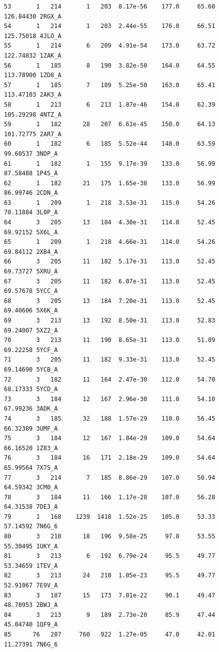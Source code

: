 \documentclass[
  letterpaper,
  DIV=11,
  numbers=noendperiod]{scrartcl}
\begin{document}
\begin{verbatim}
53       1   214       1   203  8.17e-56    177.0     65.60   126.84430 2RGX_A
54       1   214       1   203  2.44e-55    176.0     66.51   125.75018 4JLO_A
55       1   214       6   209  4.91e-54    173.0     63.72   122.74832 1ZAK_A
56       1   185       8   190  3.82e-50    164.0     64.55   113.78900 1ZD8_A
57       1   185       7   189  5.25e-50    163.0     65.41   113.47103 2AK3_A
58       1   213       6   213  1.87e-46    154.0     62.39   105.29298 4NTZ_A
59       1   182      28   207  6.61e-45    150.0     64.13   101.72775 2AR7_A
60       1   182       6   185  5.52e-44    148.0     63.59    99.60537 3NDP_A
61       1   182       1   155  9.17e-39    133.0     56.99    87.58488 1P4S_A
62       1   182      21   175  1.65e-38    133.0     56.99    86.99746 2CDN_A
63       1   209       1   218  3.53e-31    115.0     54.26    70.11884 3L0P_A
64       3   205      13   184  4.30e-31    114.0     52.45    69.92152 5X6L_A
65       1   209       1   218  4.66e-31    114.0     54.26    69.84112 2XB4_A
66       3   205      11   182  5.17e-31    113.0     52.45    69.73727 5XRU_A
67       3   205      11   182  6.07e-31    113.0     52.45    69.57678 5YCC_A
68       3   205      13   184  7.20e-31    113.0     52.45    69.40606 5X6K_A
69       3   213      13   192  8.50e-31    113.0     52.83    69.24007 5XZ2_A
70       3   213      11   190  8.65e-31    113.0     51.89    69.22258 5YCF_A
71       3   205      11   182  9.33e-31    113.0     52.45    69.14690 5YCB_A
72       3   182      11   164  2.47e-30    112.0     54.70    68.17333 5YCD_A
73       3   184      12   167  2.96e-30    111.0     54.10    67.99236 3ADK_A
74       3   185      32   188  1.57e-29    110.0     56.45    66.32389 3UMF_A
75       3   184      12   167  1.84e-29    109.0     54.64    66.16520 1Z83_A
76       3   184      16   171  2.18e-29    109.0     54.64    65.99564 7X7S_A
77       3   214       7   185  8.86e-29    107.0     50.94    64.59342 3CM0_A
78       3   184      11   166  1.17e-28    107.0     56.28    64.31538 7DE3_A
79       1   168    1239  1418  1.52e-25    105.0     53.33    57.14592 7N6G_6
80       3   210      18   196  9.58e-25     97.8     53.55    55.30495 1UKY_A
81       3   213       6   192  6.79e-24     95.5     49.77    53.34659 1TEV_A
82       3   213      24   210  1.05e-23     95.5     49.77    52.91067 7E9V_A
83       3   187      15   173  7.01e-22     90.1     49.47    48.70953 2BWJ_A
84       3   213       9   189  2.73e-20     85.9     47.44    45.04740 1QF9_A
85      76   207     760   922  1.27e-05     47.0     42.01    11.27391 7N6G_6

\end{verbatim}
\end{document}
